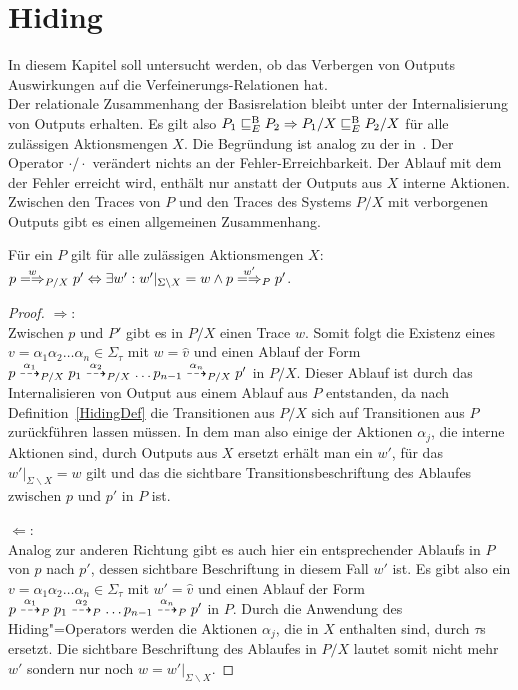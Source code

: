\section{Hiding}

In diesem Kapitel soll untersucht werden, ob das Verbergen von Outputs
Auswirkungen auf die Verfeinerungs-Relationen \ERel{} hat.\\
Der relationale Zusammenhang der Basisrelation \EBRel{} bleibt unter der
Internalisierung von Outputs erhalten. Es gilt also $P_1 \sqsubseteq  _E^\mathrm{B} P_2 \Rightarrow
P_1/X \sqsubseteq  _E^\mathrm{B} P_2/X$ für alle zulässigen Aktionsmengen $X$. Die Begründung ist
analog zu der in~\cite{Schinko2016BA}. Der Operator $\cdot /\cdot$ verändert
nichts an der Fehler-Erreichbarkeit. Der Ablauf mit dem der Fehler erreicht
wird, enthält nur anstatt der Outputs aus $X$ interne Aktionen.\\
Zwischen den Traces von $P$ und den Traces des Systems $P/X$ mit verborgenen
Outputs gibt es einen allgemeinen Zusammenhang.

\begin{Lem}
  \label{TraceHidingLem}
  Für ein \MEIO{} $P$ gilt für alle zulässigen Aktionsmengen $X$: $p
  \weakmay[w]_{P/X} p' \Leftrightarrow \exists w': w'|_{\Sigma\backslash X} = w
  \land p \weakmay[w']_P p'$.
\end{Lem}
\begin{proof}
  \glqq $\Rightarrow$\grqq{}:\\
  Zwischen $p$ und $P'$ gibt es in $P/X$ einen Trace $w$. Somit folgt die
  Existenz eines $v=\alpha _1\alpha_2\dots\alpha _n\in\Sigma _{\tau}$ mit $w =
  \hat{v}$ und einen Ablauf der Form $p \may[\alpha _1]_{P/X} p_1 \may[\alpha
  _2]_{P/X} \dots p_{n-1} \may[\alpha _n]_{P/X} p'$ in $P/X$. Dieser Ablauf ist
  durch das Internalisieren von Output aus einem Ablauf aus $P$ entstanden, da
  nach Definition~\ref{HidingDef} die Transitionen aus $P/X$ sich auf
  Transitionen aus $P$ zurückführen lassen müssen. In dem man also einige der
  Aktionen $\alpha_j$, die interne Aktionen sind, durch Outputs aus $X$ ersetzt
  erhält man ein $w'$, für das $w'|_{\Sigma\backslash X}=w$ gilt und das die
  sichtbare Transitionsbeschriftung des Ablaufes zwischen $p$ und $p'$ in $P$
  ist.

  \glqq $\Leftarrow$\grqq{}:\\
  Analog zur anderen Richtung gibt es auch hier ein entsprechender Ablaufs in
  $P$ von $p$ nach $p'$, dessen sichtbare Beschriftung in diesem Fall $w'$ ist.
  Es gibt also ein $v=\alpha _1\alpha_2\dots\alpha _n\in\Sigma _{\tau}$ mit $w'
  = \hat{v}$ und einen Ablauf der Form $p \may[\alpha _1]_P p_1 \may[\alpha
  _2]_P \dots p_{n-1} \may[\alpha _n]_P p'$ in $P$. Durch die Anwendung des
  Hiding"=Operators werden die Aktionen $\alpha _j$, die in $X$ enthalten sind,
  durch $\tau$s ersetzt. Die sichtbare Beschriftung des Ablaufes in $P/X$
  lautet somit nicht mehr $w'$ sondern nur noch $w = w'|_{\Sigma\backslash X}$.
\end{proof}

